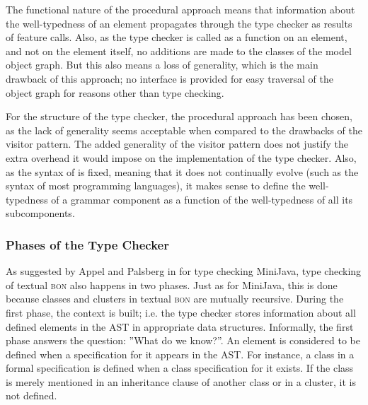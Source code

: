 The functional nature of the procedural approach means that information about the well-typedness of an element propagates through the type checker as results of feature calls. Also, as the type checker is called as a function on an element, and not on the element itself, no additions are made to the classes of the model object graph. But this also means a loss of generality, which is the main drawback of this approach; no interface is provided for easy traversal of the object graph for reasons other than type checking.

For the structure of the type checker, the procedural approach has been chosen, as the lack of generality seems acceptable when compared to the drawbacks of the visitor pattern. The added generality of the visitor pattern does not justify the extra overhead it would impose on the implementation of the type checker. Also, as the syntax of \bon{} is fixed, meaning that it does not continually evolve (such as the syntax of most programming languages), it makes sense to define the well-typedness of a grammar component as a function of the well-typedness of all its subcomponents.

\subsubsection	{Phases of the Type Checker}
\label{design-phases}
As suggested by Appel and Palsberg in \cite[section~5.2]{appel2004} for type checking MiniJava, type checking of textual \textsc{bon} also happens in two phases. Just as for MiniJava, this is done because classes and clusters in textual \textsc{bon} are mutually recursive.
During the first phase, the context is built; i.e. the type checker stores information about all defined elements in the AST in appropriate data structures. Informally, the first phase answers the question: ''What do we know?''. An element is considered to be defined when a specification for it appears in the AST. For instance, a class in a formal specification is defined when a class specification for it exists. If the class is merely mentioned in an inheritance clause of another class or in a cluster, it is not defined.

